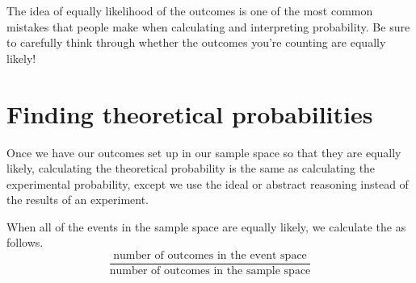 \documentclass{ximera}
\begin{document}
The idea of equally likelihood of the outcomes is one of the most common mistakes that people make when calculating and interpreting probability. Be sure to carefully think through whether the outcomes you're counting are equally likely!


\section{Finding theoretical probabilities}
Once we have our outcomes set up in our sample space so that they are equally likely, calculating the theoretical probability is the same as calculating the experimental probability, except we use the ideal or abstract reasoning instead of the results of an experiment.
\begin{theorem}
When all of the events in the sample space are equally likely, we calculate the  as follows.
\[
\frac{\textrm{number of outcomes in the event space}}{\textrm{number of outcomes in the sample space}}
\]
\end{theorem}
\end{document}
